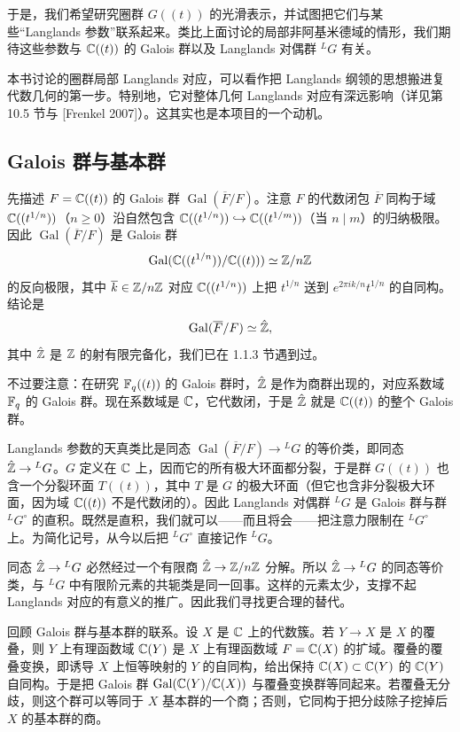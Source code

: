 于是，我们希望研究圈群 $G((t))$ 的光滑表示，并试图把它们与某些“Langlands 参数”联系起来。类比上面讨论的局部非阿基米德域的情形，我们期待这些参数与 $\mathbb{C}((t))$ 的 Galois 群以及 Langlands 对偶群 ${}^L G$ 有关。

本书讨论的圈群局部 Langlands 对应，可以看作把 Langlands 纲领的思想搬进复代数几何的第一步。特别地，它对整体几何 Langlands 对应有深远影响（详见第 10.5 节与 [Frenkel 2007]）。这其实也是本项目的一个动机。

\subsection{Galois 群与基本群}

先描述 $F=\mathbb{C}((t))$ 的 Galois 群 $\operatorname{Gal}(\overline F/F)$。注意 $F$ 的代数闭包 $\overline F$ 同构于域 $\mathbb{C}((t^{1/n}))$（$n\ge 0$）沿自然包含 $\mathbb{C}((t^{1/n}))\hookrightarrow\mathbb{C}((t^{1/m}))$（当 $n\mid m$）的归纳极限。因此 $\operatorname{Gal}(\overline F/F)$ 是 Galois 群
\[
    \operatorname{Gal}(\mathbb{C}((t^{1/n}))/\mathbb{C}((t)))\simeq \mathbb{Z}/n\mathbb{Z}
\]
的反向极限，其中 $\overline{k}\in\mathbb{Z}/n\mathbb{Z}$ 对应 $\mathbb{C}((t^{1/n}))$ 上把 $t^{1/n}$ 送到 $e^{2\pi i k/n}t^{1/n}$ 的自同构。结论是
\[
    \operatorname{Gal}(\overline F/F)\simeq \hat{\mathbb{Z}},
\]
其中 $\hat{\mathbb{Z}}$ 是 $\mathbb{Z}$ 的射有限完备化，我们已在 1.1.3 节遇到过。

不过要注意：在研究 $\mathbb{F}_q((t))$ 的 Galois 群时，$\hat{\mathbb{Z}}$ 是作为商群出现的，对应系数域 $\mathbb{F}_q$ 的 Galois 群。现在系数域是 $\mathbb{C}$，它代数闭，于是 $\hat{\mathbb{Z}}$ 就是 $\mathbb{C}((t))$ 的整个 Galois 群。

Langlands 参数的天真类比是同态 $\operatorname{Gal}(\overline F/F)\to{}^L G$ 的等价类，即同态 $\hat{\mathbb{Z}}\to{}^L G$。$G$ 定义在 $\mathbb{C}$ 上，因而它的所有极大环面都分裂，于是群 $G((t))$ 也含一个分裂环面 $T((t))$，其中 $T$ 是 $G$ 的极大环面（但它也含非分裂极大环面，因为域 $\mathbb{C}((t))$ 不是代数闭的）。因此 Langlands 对偶群 ${}^L G$ 是 Galois 群与群 ${}^L G^\circ$ 的直积。既然是直积，我们就可以——而且将会——把注意力限制在 ${}^L G^\circ$ 上。为简化记号，从今以后把 ${}^L G^\circ$ 直接记作 ${}^L G$。

同态 $\hat{\mathbb{Z}}\to{}^L G$ 必然经过一个有限商 $\hat{\mathbb{Z}}\to\mathbb{Z}/n\mathbb{Z}$ 分解。所以 $\hat{\mathbb{Z}}\to{}^L G$ 的同态等价类，与 ${}^L G$ 中有限阶元素的共轭类是同一回事。这样的元素太少，支撑不起 Langlands 对应的有意义的推广。因此我们寻找更合理的替代。

回顾 Galois 群与基本群的联系。设 $X$ 是 $\mathbb{C}$ 上的代数簇。若 $Y\to X$ 是 $X$ 的覆叠，则 $Y$ 上有理函数域 $\mathbb{C}(Y)$ 是 $X$ 上有理函数域 $F=\mathbb{C}(X)$ 的扩域。覆叠的覆叠变换，即诱导 $X$ 上恒等映射的 $Y$ 的自同构，给出保持 $\mathbb{C}(X)\subset\mathbb{C}(Y)$ 的 $\mathbb{C}(Y)$ 自同构。于是把 Galois 群 $\operatorname{Gal}(\mathbb{C}(Y)/\mathbb{C}(X))$ 与覆叠变换群等同起来。若覆叠无分歧，则这个群可以等同于 $X$ 基本群的一个商；否则，它同构于把分歧除子挖掉后 $X$ 的基本群的商。

